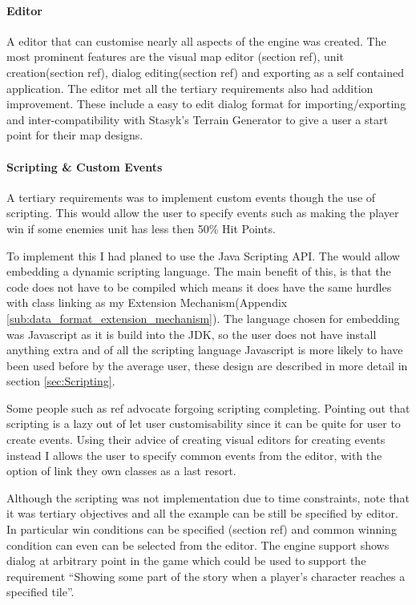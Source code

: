 \paragraph{Editor\\}
A editor that can customise nearly all aspects of the engine was created.  The most prominent features are the visual map editor (section ref), unit creation(section ref), dialog editing(section ref) and exporting as a self contained application.  The editor met all the  tertiary requirements also had addition improvement. These include a easy to edit dialog format for importing/exporting and inter-compatibility  with Stasyk’s Terrain Generator to give a user a start point for their map designs.


\paragraph{Scripting \& Custom Events\\}
A tertiary requirements was to implement custom events though the use of scripting.  This would allow the user to specify events such as making the player win if some enemies unit has less then 50\% Hit Points. 

To implement this I had planed to use the Java Scripting API\cite{javas}. The would allow embedding a dynamic scripting language.  The main benefit of this, is that the code does not have to be compiled which means it does have the same hurdles with class linking as my Extension Mechanism(Appendix \ref{sub:data_format_extension_mechanism}).   The language chosen for embedding was Javascript  as it is build into the JDK, so the user does not have install anything extra and of all the scripting language Javascript  is more likely to have been used before by the average user, these design are described in more detail in section \ref{sec:Scripting}. 

Some people such as ref  advocate forgoing scripting completing. Pointing out that scripting is a lazy out of let user customisability since it can be quite for user to create events.  Using their advice of creating visual editors for creating events instead I allows the user to specify common events from the editor, with the option of link they own classes as a last resort. 

Although the scripting was not implementation due to time constraints, note that it was  tertiary objectives and all the example can be still be specified by editor. In particular win conditions can be specified (section ref) and common winning condition can even can be selected from the editor.  The engine support shows dialog at arbitrary point in the game which could be used to support the requirement ``Showing some part of the story when a player’s character reaches a specified tile''.

